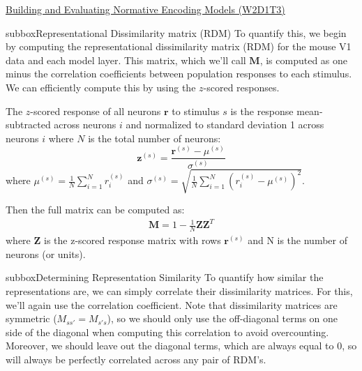 \begin{textbox}{\href{https://compneuro.neuromatch.io/tutorials/W2D1_DeepLearning/student/W2D1_Tutorial3.html}{Building and Evaluating Normative Encoding Models (W2D1T3)} }
\begin{subbox}{subbox}{Representational Dissimilarity matrix (RDM)}
\scriptsize
To quantify this, we begin by computing the representational dissimilarity matrix (RDM) for the mouse V1 data and each model layer. This matrix, which we'll call $\mathbf{M}$, is computed as one minus the correlation coefficients between population responses to each stimulus. We can efficiently compute this by using the $z$-scored responses. 

The $z$-scored response of all neurons $\mathbf{r}$ to stimulus $s$ is the response mean-subtracted across neurons $i$ and normalized to standard deviation 1 across neurons $i$ where $N$ is the total number of neurons:
\begin{equation}
  \mathbf{z}^{(s)} = \frac{\mathbf{r}^{(s)} - \mu^{(s)}}
  {\sigma^{(s)}}
\end{equation}
where $\mu^{(s)} = \frac{1}{N}\sum_{i=1}^N r_i^{(s)}$ and 
$\sigma^{(s)} = \sqrt{\frac{1}{N}\sum_{i=1}^N \left( r_i^{(s)} - \mu^{(s)} \right)^2}$.

Then the full matrix can be computed as:
\begin{gather}
  \mathbf{M} = 1 - \frac{1}{N} \mathbf{ZZ}^T
\end{gather}
where $\mathbf{Z}$ is the z-scored response matrix with rows $\mathbf{r}^{(s)}$ and N is the number of neurons (or units).
\end{subbox}
\begin{subbox}{subbox}{Determining Representation Similarity}
\scriptsize
To quantify how similar the representations are, we can simply correlate their dissimilarity matrices. For this, we'll again use the correlation coefficient. Note that dissimilarity matrices are symmetric ($M_{ss'} = M_{s's}$), so we should only use the off-diagonal terms on one side of the diagonal when computing this correlation to avoid overcounting. Moreover, we should leave out the diagonal terms, which are always equal to 0, so will always be perfectly correlated across any pair of RDM's.


\end{subbox}
\end{textbox}
